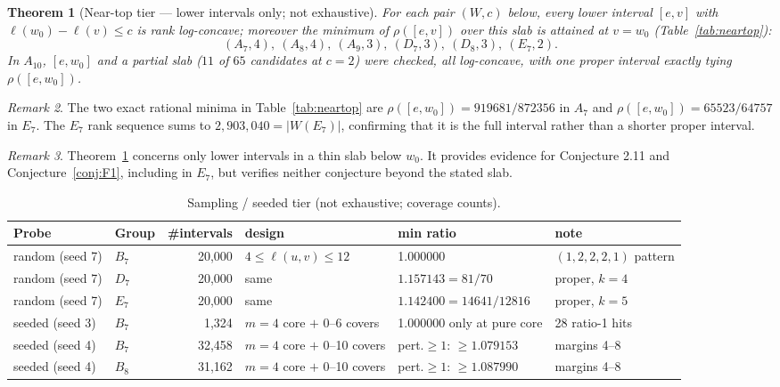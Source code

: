 \documentclass[11pt]{amsart}
\theoremstyle{plain}
\newtheorem{theorem}{Theorem}[section]
\theoremstyle{definition}
\theoremstyle{remark}
\newtheorem{remark}[theorem]{Remark}
\newcommand{\W}{W}
\begin{document}
\begin{theorem}[Near-top tier --- lower intervals only; not exhaustive]
\label{thm:V2}
For each pair $(\W,c)$ below, every lower interval $[e,v]$ with
$\ell(w_0)-\ell(v)\le c$ is rank log-concave; moreover the minimum of
$\rho([e,v])$ over this slab is attained at $v=w_0$
(Table~\ref{tab:neartop}):
\[
(A_7,4),\ (A_8,4),\ (A_9,3),\ (D_7,3),\ (D_8,3),\ (E_7,2).
\]
In $A_{10}$, $[e,w_0]$ and a partial slab ($11$ of $65$ candidates at
$c=2$) were checked, all log-concave, with one proper interval exactly
tying $\rho([e,w_0])$.
\end{theorem}

\begin{remark}
The two exact rational minima in Table~\ref{tab:neartop} are
$\rho([e,w_0])=919681/872356$ in $A_7$ and
$\rho([e,w_0])=65523/64757$ in $E_7$. The $E_7$ rank sequence sums to
$2{,}903{,}040=|W(E_7)|$, confirming that it is the full interval rather
than a shorter proper interval.
\end{remark}

\begin{remark}
Theorem~\ref{thm:V2} concerns only lower intervals in a thin slab below
$w_0$. It provides evidence for Conjecture 2.11 and
Conjecture~\ref{conj:F1}, including in $E_7$, but verifies neither
conjecture beyond the stated slab.
\end{remark}

\begin{table}[htbp]
\centering
\caption{Sampling / seeded tier (not exhaustive; coverage counts).}
\label{tab:sampling}
\small
\begin{tabular}{@{}llrlll@{}}
\toprule
Probe & Group & \#intervals & design & min ratio & note \\
\midrule
random (seed 7) & $B_7$ & 20{,}000 & $4\le\ell(u,v)\le12$ & 1.000000 & $(1,2,2,2,1)$ pattern \\
random (seed 7) & $D_7$ & 20{,}000 & same & $1.157143=81/70$ & proper, $k{=}4$ \\
random (seed 7) & $E_7$ & 20{,}000 & same & $1.142400=14641/12816$ & proper, $k{=}5$ \\
seeded (seed 3) & $B_7$ & 1{,}324 & $m{=}4$ core $+$ 0--6 covers & 1.000000 only at pure core & 28 ratio-1 hits \\
seeded (seed 4) & $B_7$ & 32{,}458 & $m{=}4$ core $+$ 0--10 covers & pert.$\ge1$: $\ge 1.079153$ & margins 4--8 \\
seeded (seed 4) & $B_8$ & 31{,}162 & $m{=}4$ core $+$ 0--10 covers & pert.$\ge1$: $\ge 1.087990$ & margins 4--8 \\
\bottomrule
\end{tabular}
\end{table}
\end{document}
